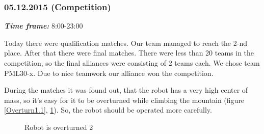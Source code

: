 \subsubsection{05.12.2015 (Competition)}
\textit{\textbf{Time frame:}} 8:00-23:00 

Today there were qualification matches. Our team managed to reach the 2-nd place. \newline
After that there were final matches. There were less than 20 teams in the competition, so the final alliances were consisting of 2 teams each. We chose team PML30-x. Due to nice teamwork our alliance won the competition.

During the matches it was found out, that the robot has a very high center of mass, so it's easy for it to be overturned while climbing the mountain (figure \ref{Overturn1.1}, \ref{Overturn1.2}). So, the robot should be operated more carefully.

\begin{figure}[H]
	\begin{minipage}[h]{0.47\linewidth}
		\caption{Robot is overturned 1}
		\label{Overturn1.1}
	\end{minipage}
	\hfill
	\begin{minipage}[h]{0.47\linewidth}
		\caption{Robot is overturned 2}
		\label{Overturn1.2}
	\end{minipage}
\end{figure}

